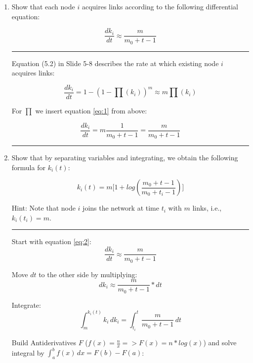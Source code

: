 \begin{enumerate}
	\item Show that each node $i$ acquires links according to the following differential equation:
	
	\begin{equation}  \label{eq:2}
		\frac{dk_i}{dt} \approx \frac{m}{m_0 + t - 1}
	\end{equation}
	
	\hrule \relax
	
	Equation (5.2) in Slide 5-8 describes the rate at which existing node $i$ acquires links:
	
	\begin{equation}
		\frac{dk_i}{dt} = 1 - (1 - \prod(k_i))^m \approx m \prod(k_i)
	\end{equation}
	
	For $\prod$ we insert equation \ref{eq:1} from above:
	
	\begin{equation}
		\frac{dk_i}{dt} = m \frac{1}{m_0 + t - 1} = \frac{m}{m_0 + t - 1}
	\end{equation}
	
	\hrule \relax
	
	\item Show that by separating variables and integrating, we obtain the following formula for $k_i(t)$:
	
	\begin{equation} \label{eq:3}
		k_i(t) = m \biggl[1 + log(\frac{m_0 + t - 1}{m_0 + t_i - 1}) \biggr]
	\end{equation}
	
	Hint: Note that node $i$ joins the network at time $t_i$ with $m$ links, i.e., $k_i(t_i) = m$.
	
	\hrule \relax
	
	Start with equation \ref{eq:2}:
	\begin{equation*}
		\frac{dk_i}{dt} \approx \frac{m}{m_0 + t - 1}
	\end{equation*}
	
	Move $dt$ to the other side by multiplying:
	\begin{equation*}
		dk_i \approx \frac{m}{m_0 + t - 1} * dt
	\end{equation*}
	
	Integrate:
	\begin{equation*}
		\int_{m}^{k_i(t)} k_i \,dk_i = \int_{t_i}^{t} \frac{m}{m_0 + t - 1} \,dt
	\end{equation*}
	
	Build Antiderivatives $F$ ($f(x) = \frac{n}{x} => F(x) = n * log(x)$) and solve integral by $\int_{a}^{b} f(x) \,dx = F(b) - F(a)$:
	

\end{enumerate}
